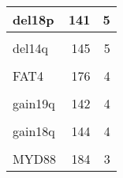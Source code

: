 \documentclass[11pt, a4paper, twosided]{book}
\begin{document}
\begin{table}
\begin{tabular}[t]{l|r|r}
\hline
del18p & 141 & 5\\
\hline
\cellcolor[HTML]{E2E868}{del15q} & \cellcolor[HTML]{E2E868}{141} & \cellcolor[HTML]{E2E868}{5}\\
\hline
del14q & 145 & 5\\
\hline
\cellcolor[HTML]{E2E868}{IKZF3} & \cellcolor[HTML]{E2E868}{176} & \cellcolor[HTML]{E2E868}{4}\\
\hline
FAT4 & 176 & 4\\
\hline
\cellcolor[HTML]{E2E868}{EGR2} & \cellcolor[HTML]{E2E868}{176} & \cellcolor[HTML]{E2E868}{4}\\
\hline
gain19q & 142 & 4\\
\hline
\cellcolor[HTML]{E2E868}{gain19p} & \cellcolor[HTML]{E2E868}{142} & \cellcolor[HTML]{E2E868}{4}\\
\hline
gain18q & 144 & 4\\
\hline
\cellcolor[HTML]{E2E868}{del9q} & \cellcolor[HTML]{E2E868}{142} & \cellcolor[HTML]{E2E868}{4}\\
\hline
MYD88 & 184 & 3\\
\hline
\end{tabular}
\end{table}
\end{document}
